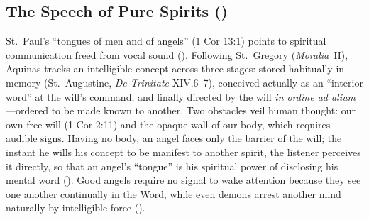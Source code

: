
\subsection{The Speech of Pure Spirits ()}

St.~Paul's ``tongues of men and of angels'' (1 Cor 13:1) points to spiritual communication freed from vocal sound (). Following St.~Gregory (\emph{Moralia}~II), Aquinas tracks an intelligible concept across three stages: stored habitually in memory (St.~Augustine, \emph{De Trinitate} XIV.6--7), conceived actually as an ``interior word'' at the will's command, and finally directed by the will \emph{in ordine ad alium}---ordered to be made known to another. Two obstacles veil human thought: our own free will (1 Cor 2:11) and the opaque wall of our body, which requires audible signs. Having no body, an angel faces only the barrier of the will; the instant he wills his concept to be manifest to another spirit, the listener perceives it directly, so that an angel's ``tongue'' is his spiritual power of disclosing his mental word (). Good angels require no signal to wake attention because they see one another continually in the Word, while even demons arrest another mind naturally by intelligible force ().

